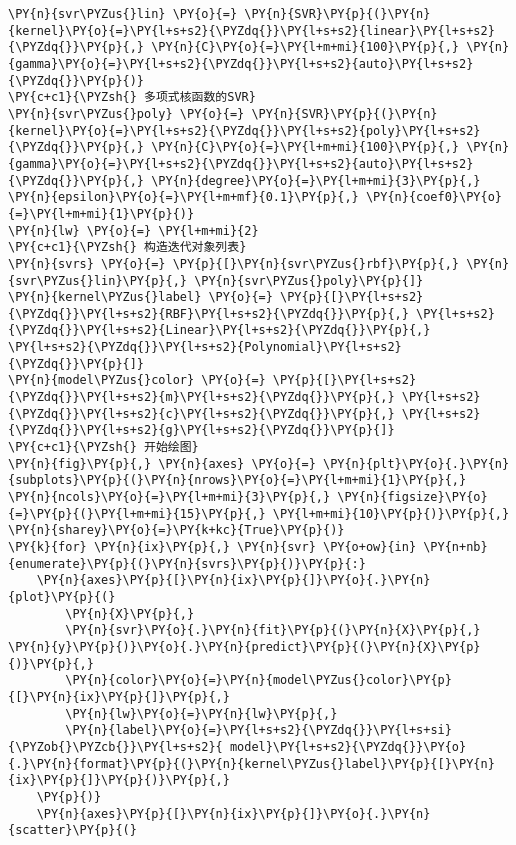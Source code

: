 \begin{Verbatim}[commandchars=\\\{\}]
\PY{n}{svr\PYZus{}lin} \PY{o}{=} \PY{n}{SVR}\PY{p}{(}\PY{n}{kernel}\PY{o}{=}\PY{l+s+s2}{\PYZdq{}}\PY{l+s+s2}{linear}\PY{l+s+s2}{\PYZdq{}}\PY{p}{,} \PY{n}{C}\PY{o}{=}\PY{l+m+mi}{100}\PY{p}{,} \PY{n}{gamma}\PY{o}{=}\PY{l+s+s2}{\PYZdq{}}\PY{l+s+s2}{auto}\PY{l+s+s2}{\PYZdq{}}\PY{p}{)}
\PY{c+c1}{\PYZsh{} 多项式核函数的SVR}
\PY{n}{svr\PYZus{}poly} \PY{o}{=} \PY{n}{SVR}\PY{p}{(}\PY{n}{kernel}\PY{o}{=}\PY{l+s+s2}{\PYZdq{}}\PY{l+s+s2}{poly}\PY{l+s+s2}{\PYZdq{}}\PY{p}{,} \PY{n}{C}\PY{o}{=}\PY{l+m+mi}{100}\PY{p}{,} \PY{n}{gamma}\PY{o}{=}\PY{l+s+s2}{\PYZdq{}}\PY{l+s+s2}{auto}\PY{l+s+s2}{\PYZdq{}}\PY{p}{,} \PY{n}{degree}\PY{o}{=}\PY{l+m+mi}{3}\PY{p}{,} \PY{n}{epsilon}\PY{o}{=}\PY{l+m+mf}{0.1}\PY{p}{,} \PY{n}{coef0}\PY{o}{=}\PY{l+m+mi}{1}\PY{p}{)}
\PY{n}{lw} \PY{o}{=} \PY{l+m+mi}{2}
\PY{c+c1}{\PYZsh{} 构造迭代对象列表}
\PY{n}{svrs} \PY{o}{=} \PY{p}{[}\PY{n}{svr\PYZus{}rbf}\PY{p}{,} \PY{n}{svr\PYZus{}lin}\PY{p}{,} \PY{n}{svr\PYZus{}poly}\PY{p}{]}
\PY{n}{kernel\PYZus{}label} \PY{o}{=} \PY{p}{[}\PY{l+s+s2}{\PYZdq{}}\PY{l+s+s2}{RBF}\PY{l+s+s2}{\PYZdq{}}\PY{p}{,} \PY{l+s+s2}{\PYZdq{}}\PY{l+s+s2}{Linear}\PY{l+s+s2}{\PYZdq{}}\PY{p}{,} \PY{l+s+s2}{\PYZdq{}}\PY{l+s+s2}{Polynomial}\PY{l+s+s2}{\PYZdq{}}\PY{p}{]}
\PY{n}{model\PYZus{}color} \PY{o}{=} \PY{p}{[}\PY{l+s+s2}{\PYZdq{}}\PY{l+s+s2}{m}\PY{l+s+s2}{\PYZdq{}}\PY{p}{,} \PY{l+s+s2}{\PYZdq{}}\PY{l+s+s2}{c}\PY{l+s+s2}{\PYZdq{}}\PY{p}{,} \PY{l+s+s2}{\PYZdq{}}\PY{l+s+s2}{g}\PY{l+s+s2}{\PYZdq{}}\PY{p}{]}
\PY{c+c1}{\PYZsh{} 开始绘图}
\PY{n}{fig}\PY{p}{,} \PY{n}{axes} \PY{o}{=} \PY{n}{plt}\PY{o}{.}\PY{n}{subplots}\PY{p}{(}\PY{n}{nrows}\PY{o}{=}\PY{l+m+mi}{1}\PY{p}{,} \PY{n}{ncols}\PY{o}{=}\PY{l+m+mi}{3}\PY{p}{,} \PY{n}{figsize}\PY{o}{=}\PY{p}{(}\PY{l+m+mi}{15}\PY{p}{,} \PY{l+m+mi}{10}\PY{p}{)}\PY{p}{,} \PY{n}{sharey}\PY{o}{=}\PY{k+kc}{True}\PY{p}{)}
\PY{k}{for} \PY{n}{ix}\PY{p}{,} \PY{n}{svr} \PY{o+ow}{in} \PY{n+nb}{enumerate}\PY{p}{(}\PY{n}{svrs}\PY{p}{)}\PY{p}{:}
    \PY{n}{axes}\PY{p}{[}\PY{n}{ix}\PY{p}{]}\PY{o}{.}\PY{n}{plot}\PY{p}{(}
        \PY{n}{X}\PY{p}{,}
        \PY{n}{svr}\PY{o}{.}\PY{n}{fit}\PY{p}{(}\PY{n}{X}\PY{p}{,} \PY{n}{y}\PY{p}{)}\PY{o}{.}\PY{n}{predict}\PY{p}{(}\PY{n}{X}\PY{p}{)}\PY{p}{,}
        \PY{n}{color}\PY{o}{=}\PY{n}{model\PYZus{}color}\PY{p}{[}\PY{n}{ix}\PY{p}{]}\PY{p}{,}
        \PY{n}{lw}\PY{o}{=}\PY{n}{lw}\PY{p}{,}
        \PY{n}{label}\PY{o}{=}\PY{l+s+s2}{\PYZdq{}}\PY{l+s+si}{\PYZob{}\PYZcb{}}\PY{l+s+s2}{ model}\PY{l+s+s2}{\PYZdq{}}\PY{o}{.}\PY{n}{format}\PY{p}{(}\PY{n}{kernel\PYZus{}label}\PY{p}{[}\PY{n}{ix}\PY{p}{]}\PY{p}{)}\PY{p}{,}
    \PY{p}{)}
    \PY{n}{axes}\PY{p}{[}\PY{n}{ix}\PY{p}{]}\PY{o}{.}\PY{n}{scatter}\PY{p}{(}

\end{Verbatim}
